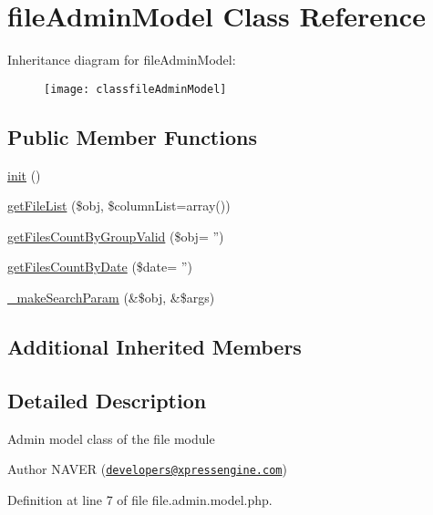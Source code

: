 \hypertarget{classfileAdminModel}{\section{file\-Admin\-Model Class Reference}
\label{classfileAdminModel}
}
Inheritance diagram for file\-Admin\-Model\-:\begin{figure}[H]
\begin{center}
\leavevmode
\texttt{[image: classfileAdminModel]}
\end{center}
\end{figure}
\subsection*{Public Member Functions}
\begin{DoxyCompactItemize}
\item 
\hyperlink{classfileAdminModel_a043ae7934f6fb3bb6ef24bff36a63795}{init} ()
\item 
\hyperlink{classfileAdminModel_a19433395ef400eaf33876d93db918a29}{get\-File\-List} (\$obj, \$column\-List=array())
\item 
\hyperlink{classfileAdminModel_a0523b70f599166913414c375318bcc83}{get\-Files\-Count\-By\-Group\-Valid} (\$obj= '')
\item 
\hyperlink{classfileAdminModel_a2cff52618c56e1ebae4e392646c859e8}{get\-Files\-Count\-By\-Date} (\$date= '')
\item 
\hyperlink{classfileAdminModel_a2da869c66512ff677a71674030c8637c}{\-\_\-make\-Search\-Param} (\&\$obj, \&\$args)
\end{DoxyCompactItemize}
\subsection*{Additional Inherited Members}


\subsection{Detailed Description}
Admin model class of the file module \begin{DoxyAuthor}{Author}
N\-A\-V\-E\-R (\href{mailto:developers@xpressengine.com}{\tt developers@xpressengine.\-com}) 
\end{DoxyAuthor}


Definition at line 7 of file file.\-admin.\-model.\-php.



